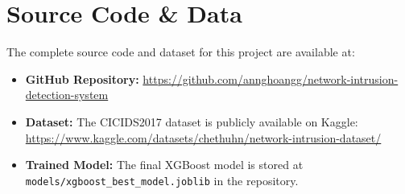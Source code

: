 \documentclass[12pt, a4paper]{article}
\begin{document}
\section{Source Code \& Data}

The complete source code and dataset for this project are available at:

\begin{itemize}
    \item \textbf{GitHub Repository:} 
    \url{https://github.com/annghoangg/network-intrusion-detection-system}

    \item \textbf{Dataset:} The CICIDS2017 dataset is publicly available on Kaggle:
    \url{https://www.kaggle.com/datasets/chethuhn/network-intrusion-dataset/}

    \item \textbf{Trained Model:} The final XGBoost model is stored at \texttt{models/xgboost\_best\_model.joblib} in the repository.
\end{itemize}
\end{document}

